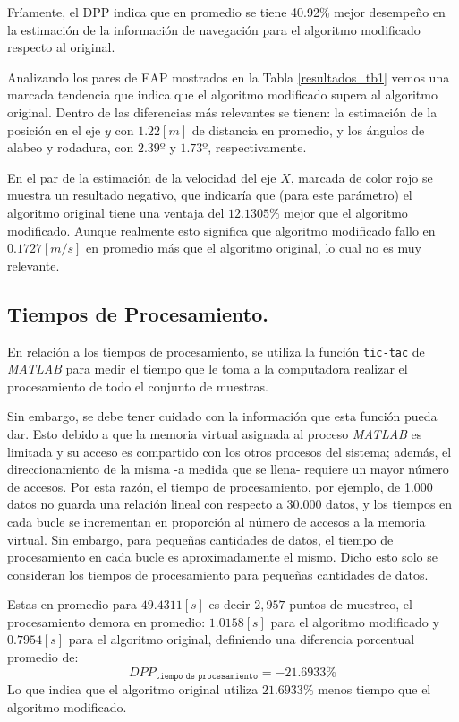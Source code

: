 \documentclass[conference]{IEEEtran}
\begin{document}
Fríamente, el DPP indica que en promedio se tiene 40.92\% mejor desempeño en la estimación de la información de navegación para el algoritmo modificado respecto al original.\par
Analizando los pares de EAP mostrados en la Tabla \ref{resultados_tb1} vemos una marcada tendencia que indica que el algoritmo modificado supera al algoritmo original. Dentro de las diferencias más relevantes se tienen: la estimación de la posición en el eje $y$  con $1.22[m]$ de distancia en promedio, y los ángulos de alabeo y rodadura, con $2.39º$ y $1.73º$, respectivamente.\par
En el par de la estimación de la velocidad del eje $X$, marcada de color rojo se muestra un resultado negativo, que indicaría que (para este parámetro) el algoritmo original tiene una ventaja del $12.1305\%$ mejor que el algoritmo modificado. Aunque realmente esto significa que algoritmo modificado fallo en $0.1727[m/s]$ en promedio más que el algoritmo original, lo cual no es muy relevante.\par
\subsection{Tiempos de Procesamiento.}
En relación a los tiempos de procesamiento, se utiliza la función \texttt{tic-tac} de \textsl{MATLAB} para medir el tiempo que le toma a la computadora realizar el procesamiento de todo el conjunto de muestras.\par
Sin embargo, se debe tener cuidado con la información que esta función pueda dar. Esto debido a que la memoria virtual asignada al proceso \textsl{MATLAB} es limitada y su acceso es compartido con los otros procesos del sistema; además, el direccionamiento de la misma -a medida que se llena- requiere un mayor número de accesos. Por esta razón, el tiempo de procesamiento, por ejemplo, de 1.000 datos no guarda una relación lineal con respecto a 30.000 datos, y los tiempos en cada bucle se incrementan en proporción al número de accesos a la memoria virtual. Sin embargo, para pequeñas cantidades de datos, el tiempo de procesamiento en cada bucle es aproximadamente el mismo. Dicho esto solo se consideran los tiempos de procesamiento para pequeñas cantidades de datos.\par
Estas en promedio para $49.4311 [s]$ es decir $2,957$ puntos de muestreo, el procesamiento demora en promedio: $1.0158[s]$ para el algoritmo modificado y $0.7954 [s]$ para el algoritmo original, definiendo una diferencia porcentual promedio de:
\begin{equation}
DPP_{\texttt{tiempo de procesamiento}}=-21.6933\%
\end{equation}
Lo que indica que el algoritmo original utiliza $21.6933\%$ menos tiempo que el algoritmo modificado.
\end{document}

